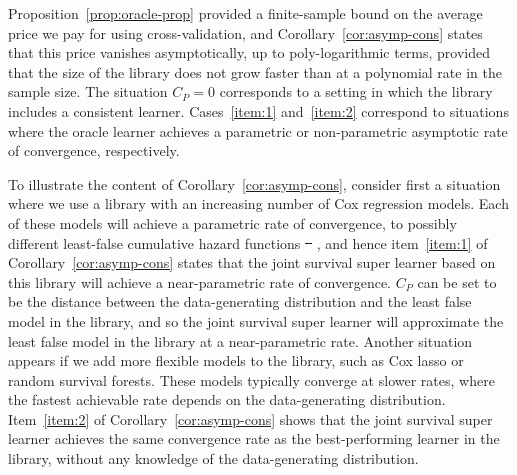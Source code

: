 \documentclass[alpha-refs]{wiley-article}
\newcommand{\1}{\mathbb{1}} %
\providecommand{\DIFaddtex}[1]{{\protect\color{blue}\uwave{#1}}} %
\providecommand{\DIFdeltex}[1]{{\protect\color{red}\sout{#1}}}                      %
\providecommand{\DIFaddbegin}{} %
\providecommand{\DIFaddend}{} %
\providecommand{\DIFdelbegin}{} %
\providecommand{\DIFdelend}{} %
\providecommand{\DIFadd}[1]{\texorpdfstring{\DIFaddtex{#1}}{#1}} %
\providecommand{\DIFdel}[1]{\texorpdfstring{\DIFdeltex{#1}}{}} %
\begin{document}
Proposition~\ref{prop:oracle-prop} provided a finite-sample bound
on the average price we pay for using cross-validation, and
Corollary~\ref{cor:asymp-cons} states that this price vanishes
asymptotically, up to poly-logarithmic terms, provided that the size
of the library does not grow faster than at a polynomial rate in the
sample size. The situation \( C_P=0 \) corresponds to a setting in
which the library includes a consistent learner. Cases~\ref{item:1}
and~\ref{item:2} correspond to situations where the oracle learner
achieves a parametric or non-parametric asymptotic rate of
convergence, respectively.

To illustrate the content of Corollary~\ref{cor:asymp-cons}, consider
first a situation where we use a library with an increasing number of
Cox regression models. Each of these models will achieve a parametric
rate of convergence, to possibly different least-false cumulative
hazard functions \DIFdelbegin \DIFdel{\mbox{%
\cite{hjort1992inference}}\hskip0pt%
}\DIFdelend \DIFaddbegin \DIFadd{\mbox{%
\citep{hjort1992inference}}\hskip0pt%
}\DIFaddend , and hence
item~\ref{item:1} of Corollary~\ref{cor:asymp-cons} states that the
joint survival super learner based on this library will achieve a
near-parametric rate of convergence.  \( C_P \) can be set to be the
distance between the data-generating distribution and the least false
model in the library, and so the joint survival super learner will
approximate the least false model in the library at a near-parametric
rate. Another situation appears if we add more flexible models to the
library, such as Cox lasso or random survival forests.  These models
typically converge at slower rates, where the fastest achievable rate
depends on the data-generating distribution.  Item~\ref{item:2} of
Corollary~\ref{cor:asymp-cons} shows that the joint survival super
learner achieves the same convergence rate as the best-performing
learner in the library, without any knowledge of the data-generating
distribution.
\end{document}
